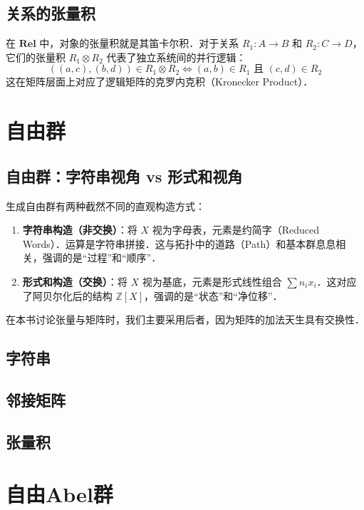 \documentclass[10pt, openany]{book}
\begin{document}
\section{关系的张量积}
在 $\mathbf{Rel}$ 中，对象的张量积就是其笛卡尔积．对于关系 $R_1: A \to B$ 和 $R_2: C \to D$，它们的张量积 $R_1 \otimes R_2$ 代表了独立系统间的并行逻辑：
\begin{equation}
((a, c), (b, d)) \in R_1 \otimes R_2 \iff (a, b) \in R_1 \text{ 且 } (c, d) \in R_2
\end{equation}
这在矩阵层面上对应了逻辑矩阵的克罗内克积（Kronecker Product）．

\chapter{自由群}

\section{自由群：字符串视角 vs 形式和视角}
生成自由群有两种截然不同的直观构造方式：
\begin{enumerate}
    \item \textbf{字符串构造（非交换）}：将 $X$ 视为字母表，元素是约简字（Reduced Words）．运算是字符串拼接．这与拓扑中的道路（Path）和基本群息息相关，强调的是“过程”和“顺序”．
    \item \textbf{形式和构造（交换）}：将 $X$ 视为基底，元素是形式线性组合 $\sum n_i x_i$．这对应了阿贝尔化后的结构 $\mathbb{Z}[X]$，强调的是“状态”和“净位移”．
\end{enumerate}
在本书讨论张量与矩阵时，我们主要采用后者，因为矩阵的加法天生具有交换性．

\section{字符串}

\section{邻接矩阵}

\section{张量积}

\chapter{自由Abel群}
\end{document}
